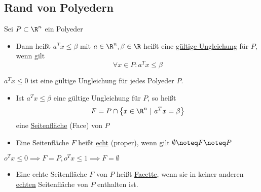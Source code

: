 \subsection{Rand von Polyedern}
\begin{definition}
	Sei $P \subset \R^n$ ein Polyeder
	\begin{itemize}
		\item Dann heißt $a^{T} x \leq \beta$ mit $a \in \R^n, \beta \in \R$ heißt eine \underline{gültige Ungleichung} für $P$, wenn gilt
			 \begin{equation*}
				\forall x \in P: a^{T} x \leq \beta
			\end{equation*}
	\end{itemize}
\end{definition}
\begin{beispiel}
	$a^{T} x \leq 0$ ist eine gültige Ungleichung für jedes Polyeder $P$.
	 \begin{itemize}
		\item Ist $a^{T} x \leq \beta$ eine gültige Ungleichung für $P$, so heißt 
			\begin{equation*}
				F = P \cap \left\{ x \in \R^n\ |\ a^{T} x = \beta \right\}
			\end{equation*}
			eine \underline{Seitenfläche} (Face) von $P$ 
		\item Eine Seitenfläche $F$ heißt \underline{echt} (proper), wenn gilt $\emptyset \noteq F \noteq P$
	\end{itemize}
\end{beispiel}
\begin{beispiel}
	$o^{T} x \leq 0 \implies F = P, o^{T} x \leq 1 \implies F = \emptyset$ 
	\begin{itemize}
		\item Eine echte Seitenfläche $F$ von $P$ heißt \underline{Facette}, wenn sie in keiner anderen \underline{echten} Seitenfläche von  $P$ enthalten ist.
	\end{itemize}
\end{beispiel}

